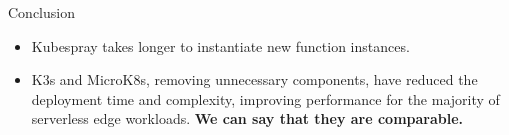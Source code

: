 \begin{frame}{Conclusion}
\begin{itemize}
    \item Kubespray takes longer to instantiate new function instances.
    \item K3s and MicroK8s, removing unnecessary components, have reduced the deployment time and complexity, improving performance for the majority of serverless edge workloads. \pause \textbf{\alert{We can say that they are comparable.}}
\end{itemize}
\end{frame}